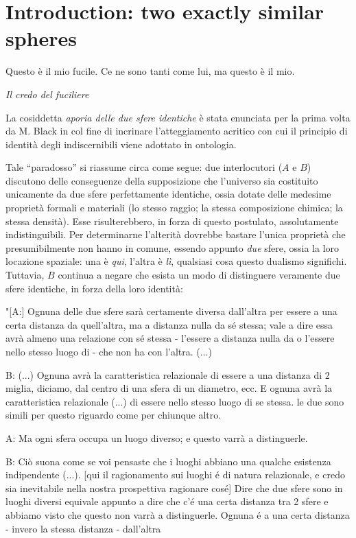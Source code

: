\section{Introduction: two exactly similar spheres}
\epigraph{%
  Questo è il mio fucile. Ce ne sono tanti come lui, ma questo è il mio.
}{\emph{Il credo del fuciliere}}

La cosiddetta \emph{aporia delle due sfere identiche} è stata enunciata per la prima volta da M. Black in \cite{foo} col fine di incrinare l'atteggiamento acritico con cui il principio di identità degli indiscernibili viene adottato in ontologia.

Tale ``paradosso'' si riassume circa come segue: due interlocutori ($A$ e $B$) discutono delle conseguenze della supposizione che l'universo sia costituito unicamente da due sfere perfettamente identiche, ossia dotate delle medesime proprietà formali e materiali (lo stesso raggio; la stessa composizione chimica; la stessa densità). Esse risulterebbero, in forza di questo postulato, assolutamente indistinguibili. Per determinarne l'alterità dovrebbe bastare l'unica proprietà che presumibilmente non hanno in comune, essendo appunto \emph{due} sfere, ossia la loro locazione spaziale: una è \emph{qui}, l'altra è \emph{lì}, qualsiasi cosa questo dualismo significhi. Tuttavia, $B$ continua a negare che esista un modo di distinguere veramente due sfere identiche, in forza della loro identità:

"[A:] Ognuna delle due sfere sarà certamente diversa dall'altra per essere a una certa distanza da quell'altra, ma a distanza nulla da sé stessa; vale a dire essa avrà almeno una relazione con sé stessa - l'essere a distanza nulla da o l'essere nello stesso luogo di - che non ha con l'altra. (...)

B: (...) Ognuna avrà la caratteristica relazionale di essere a una distanza di 2 miglia, diciamo, dal centro di una sfera di un diametro, ecc. E ognuna avrà la caratteristica relazionale (...) di essere nello stesso luogo di se stessa. le due sono simili per questo riguardo come per chiunque altro.

A: Ma ogni sfera occupa un luogo diverso; e questo varrà a distinguerle.

B: Ciò suona come se voi pensaste che i luoghi abbiano una qualche esistenza indipendente (...). [qui il ragionamento sui luoghi é di natura relazionale, e credo sia inevitabile nella nostra prospettiva ragionare cos\'e] Dire che due sfere sono in luoghi diversi equivale appunto a dire che c'é una certa distanza tra 2 sfere e abbiamo visto che questo non varrà a distinguerle. Ognuna é a una certa distanza - invero la stessa distanza - dall'altra

